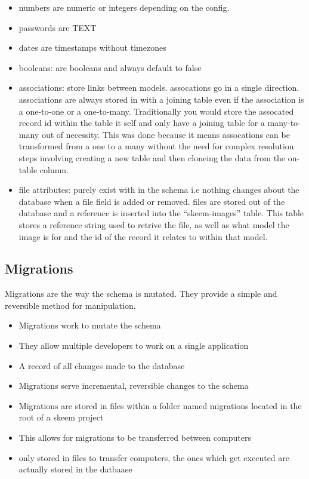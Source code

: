 \documentclass[
  12pt,
]{article}
\begin{document}
\begin{itemize}
\item
  numbers are numeric or integers depending on the config.
\item
  passwords are TEXT
\item
  dates are timestamps without timezones
\item
  booleans: are booleans and always default to false
\item
  associations: store links between models. assocations go in a single
  direction. associations are always stored in with a joining table even
  if the association is a one-to-one or a one-to-many. Traditionally you
  would store the assocated record id within the table it self and only
  have a joining table for a many-to-many out of necessity. This was
  done because it means assocations can be transformed from a one to a
  many without the need for complex resolution steps involving creating
  a new table and then cloneing the data from the on-table column.
\item
  file attributes: purely exist with in the schema i.e nothing changes
  about the database when a file field is added or removed. files are
  stored out of the database and a reference is inserted into the
  ``skeem-images'' table. This table stores a reference string used to
  retrive the file, as well as what model the image is for and the id of
  the record it relates to within that model.
\end{itemize}

\hypertarget{migrations}{%
\subsection{Migrations}\label{migrations}}

Migrations are the way the schema is mutated. They provide a simple and
reversible method for manipulation.

\begin{itemize}
\item
  Migrations work to mutate the schema
\item
  They allow multiple developers to work on a single application
\item
  A record of all changes made to the database
\item
  Migrations serve incremental, reversible changes to the schema
\item
  Migrations are stored in files within a folder named migrations
  located in the root of a skeem project
\item
  This allows for migrations to be transferred between computers
\item
  only stored in files to transfer computers, the ones which get
  executed are actually stored in the datbaase
\end{itemize}
\end{document}

